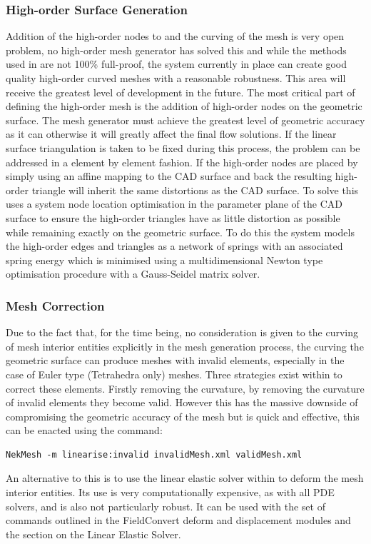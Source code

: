 \subsubsection{High-order Surface Generation}

Addition of the high-order nodes to and the curving of the mesh is very open
problem, no high-order mesh generator has solved this and while the methods
used in \nm are not 100\% full-proof, the system currently in place can create
good quality high-order curved meshes with a reasonable robustness. This area
will receive the greatest level of development in the future. The most critical
part of defining the high-order mesh is the addition of high-order nodes on the
geometric surface. The mesh generator must achieve the greatest level of
geometric accuracy as it can otherwise it will greatly affect the final flow
solutions. If the linear surface triangulation is taken to be fixed during this
process, the problem can be addressed in a element by element fashion. If the
high-order nodes are placed by simply using an affine mapping to the CAD surface
and back the resulting high-order triangle will inherit the same distortions as
the CAD surface. To solve this \nm uses a system node location optimisation in
the parameter plane of the CAD surface to ensure the high-order triangles have
as little distortion as possible while remaining exactly on the geometric
surface. To do this the system models the high-order edges and triangles as a
network of springs with an associated spring energy which is minimised using a
multidimensional Newton type optimisation procedure with a Gauss-Seidel matrix
solver.

\subsubsection{Mesh Correction}

Due to the fact that, for the time being, no consideration is given to the
curving of mesh interior entities explicitly in the mesh generation process, the
curving the geometric surface can produce meshes with invalid elements,
especially in the case of Euler type (Tetrahedra only) meshes. Three strategies
exist within \nekpp to correct these elements. Firstly removing the curvature,
by removing the curvature of invalid elements they become valid. However this
has the massive downside of compromising the geometric accuracy of the mesh but
is quick and effective, this can be enacted using the command:
\begin{lstlisting}[style=BashInputStyle]
    NekMesh -m linearise:invalid invalidMesh.xml validMesh.xml
\end{lstlisting}
%
An alternative to this is to use the linear elastic solver within \nekpp to
deform the mesh interior entities. Its use is very computationally expensive,
as with all PDE solvers, and is also not particularly robust. It can be used
with the set of commands outlined in the FieldConvert deform and displacement
modules and the section on the Linear Elastic Solver.

